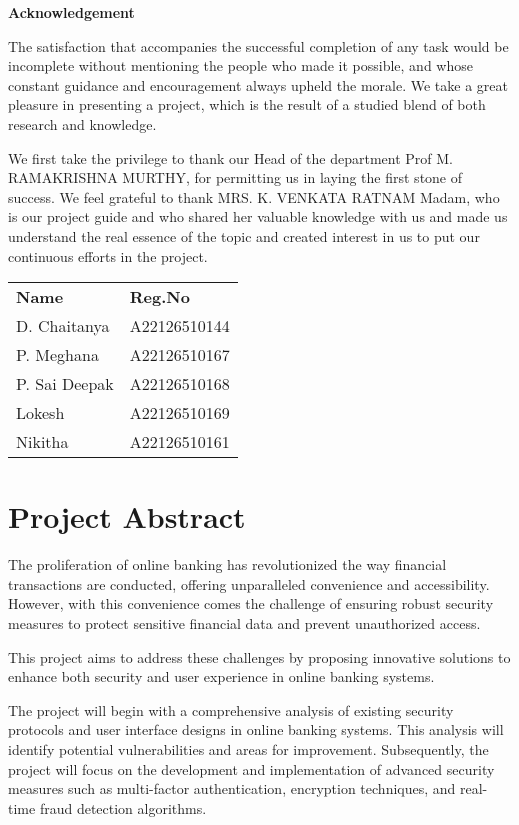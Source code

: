 \documentclass[12pt,a4paper]{report}
\begin{document}
\thispagestyle{empty}
\begin{center}
    \Large\textbf{Acknowledgement}
\end{center}
\vspace{1cm}

The satisfaction that accompanies the successful completion of any task would
be incomplete without mentioning the people who made it possible, and whose
constant guidance and encouragement always upheld the morale. We take a great
pleasure in presenting a project, which is the result of a studied blend of
both research and knowledge.

We first take the privilege to thank our Head of the department Prof M.
RAMAKRISHNA MURTHY, for permitting us in laying the first stone of success. We
feel grateful to thank MRS. K. VENKATA RATNAM Madam, who is our project guide
and who shared her valuable knowledge with us and made us understand the real
essence of the topic and created interest in us to put our continuous efforts
in the project.

\vspace{2cm}
\begin{tabular}{ll}
\textbf{Name} & \textbf{Reg.No} \\
D. Chaitanya & A22126510144 \\
P. Meghana & A22126510167 \\
P. Sai Deepak & A22126510168 \\
Lokesh & A22126510169 \\
Nikitha & A22126510161 \\
\end{tabular}
\newpage

\tableofcontents
\newpage

\chapter{Project Abstract}

The proliferation of online banking has revolutionized the way financial transactions are
conducted, offering unparalleled convenience and accessibility. However, with this
convenience comes the challenge of ensuring robust security measures to protect sensitive
financial data and prevent unauthorized access.

This project aims to address these challenges by proposing innovative solutions to enhance
both security and user experience in online banking systems.

The project will begin with a comprehensive analysis of existing security protocols and user
interface designs in online banking systems. This analysis will identify potential
vulnerabilities and areas for improvement. Subsequently, the project will focus on the
development and implementation of advanced security measures such as multi-factor
authentication, encryption techniques, and real-time fraud detection algorithms.
\end{document}
